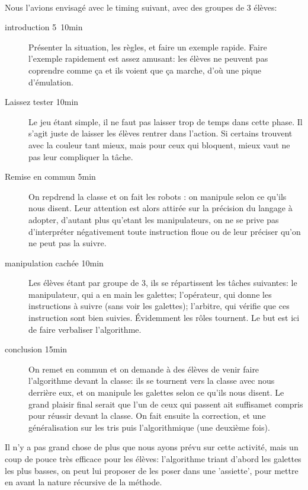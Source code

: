 \documentclass{article}
\begin{document}
 \paragraph{}
 Nous l'avions envisagé avec le timing suivant, avec des groupes de 3 élèves: 
 \begin{description}
 \item[introduction 5~10min] Présenter la situation, les règles, et faire un exemple rapide.
 Faire l'exemple rapidement est assez amusant: les élèves ne peuvent pas coprendre comme ça
 et ils voient que ça marche, d'où une pique d'émulation.
 \item[Laissez tester 10min] Le jeu étant simple, il ne faut pas laisser trop de 
 temps dans cette phase. Il s'agit juste de laisser les élèves rentrer dans l'action.
 Si certains trouvent avec la couleur tant mieux, mais pour ceux qui bloquent,
 mieux vaut ne pas leur compliquer la tâche.
 \item[Remise en commun 5min] On repdrend la classe et on fait les robots : on manipule 
 selon ce qu'ils nous disent. Leur attention est alors attirée sur la précision
 du langage à adopter, d'autant plus qu'etant les manipulateurs, on ne se prive
 pas d'interpréter négativement toute instruction floue ou de leur préciser qu'on
 ne peut pas la suivre.
 \item[manipulation cachée 10min] Les élèves étant par groupe de 3, ils se répartissent
 les tâches suivantes: le manipulateur, qui a en main les galettes; l'opérateur,
 qui donne les instructions à suivre (sans voir les galettes); l'arbitre, qui 
 vérifie que ces instruction sont bien suivies. Évidemment les rôles tournent. Le
 but est ici de faire verbaliser l'algorithme.
 \item[conclusion 15min] On remet en commun et on demande à des élèves de venir 
 faire l'algorithme devant la classe: ils se tournent vers la classe avec nous
 derrière eux, et on manipule les galettes selon ce qu'ils nous disent. Le grand 
 plaisir final serait que l'un de ceux qui passent ait suffisamet compris pour 
 réussir devant la classe. On fait ensuite la correction, et une généralisation sur
 les tris puis l'algorithmique (une deuxième fois).
 \end{description}
 Il n'y a pas grand chose de plus que nous ayons prévu sur cette activité, mais un
 coup de pouce très efficace pour les élèves: l'algorithme triant d'abord les galettes
 les plus basses, on peut lui proposer de les poser dans une 'assiette', pour mettre
 en avant la nature récursive de la méthode.
\end{document}
